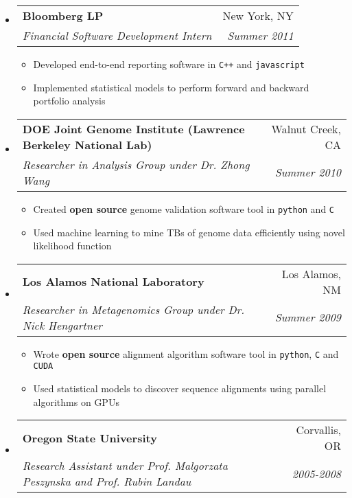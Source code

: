 \documentclass[letterpaper,11pt]{article}
\makeatletter
\newcommand{\resitem}[1]{\item #1 \vspace{-2pt}}
\newcommand{\ressubheading}[4]{

\begin{tabular*}{6.5in}{l@{\cftdotfill{\cftsecdotsep}\extracolsep{\fill}}r}

		\textbf{#1} & #2 \\

		\textit{#3} & \textit{#4} \\

\end{tabular*}\vspace{-6pt}}
\makeatother
\begin{document}
\begin{itemize}

\item

	\ressubheading{Bloomberg LP}{New York, NY}{Financial Software Development Intern}{Summer 2011}

	\begin{itemize}

		\resitem{Developed end-to-end reporting software in \texttt{C++} and \texttt{javascript}}

    \resitem{Implemented statistical models to perform forward and backward portfolio analysis}

	\end{itemize}

\item

	\ressubheading{DOE Joint Genome Institute (Lawrence Berkeley National Lab)}{Walnut Creek, CA}{Researcher in Analysis Group under Dr. Zhong Wang}{Summer 2010}

	\begin{itemize}

		\resitem{Created \textbf{open source} genome validation software tool in \texttt{python} and \texttt{C}}

    \resitem{Used machine learning to mine TBs of genome data efficiently using novel likelihood function}

	\end{itemize}

\item 

	\ressubheading{Los Alamos National Laboratory}{Los Alamos, NM}{Researcher in Metagenomics Group under Dr. Nick Hengartner}{Summer 2009}

	\begin{itemize}

		\resitem{Wrote \textbf{open source} alignment algorithm software tool in \texttt{python}, \texttt{C} and \texttt{CUDA}}

    \resitem{Used statistical models to discover sequence alignments using parallel algorithms on GPUs}

	\end{itemize}

\item

	\ressubheading{Oregon State University}{Corvallis, OR}{Research Assistant under Prof. Malgorzata Peszynska and Prof. Rubin Landau}{2005-2008}


\end{itemize}
\end{document}
